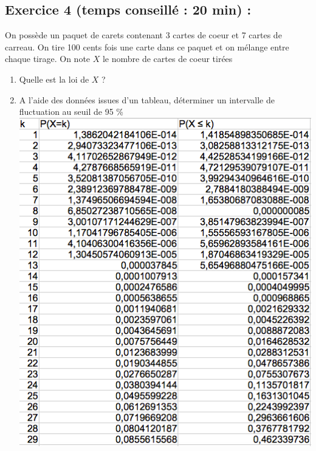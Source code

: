 \subsection*{Exercice 4 (temps conseillé : 20 min) : }
On possède un paquet de carets contenant 3 cartes de coeur et 7 cartes de carreau. On tire 100 cents fois une carte dans ce paquet et on mélange entre chaque tirage. On note $X$ le nombre de cartes de coeur tirées
\begin{enumerate}
\item Quelle est la loi de $X$ ?
\item A l'aide des données issues d'un tableau, déterminer un intervalle de fluctuation au seuil de 95 \%
\center \includegraphics[scale=0.5]{chapp11_ill1.png} \flushleft

\end{enumerate}
